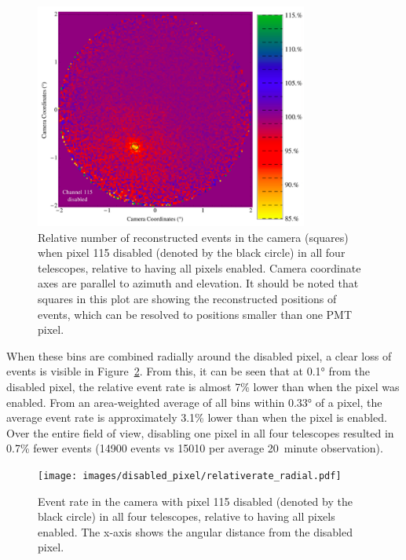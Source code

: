 \begin{figure}[!ht]
  \centering
  \includegraphics[width=0.8\textwidth]{images/disabled_pixel/relativerate_camera}
  \caption[Relative Event Rate After Disabling Camera Pixels]{
    Relative number of reconstructed events in the camera (squares) when pixel 115 disabled (denoted by the black circle) in all four telescopes, relative to having all pixels enabled.
    Camera coordinate axes are parallel to azimuth and elevation.
    It should be noted that squares in this plot are showing the reconstructed positions of events, which can be resolved to positions smaller than one PMT pixel.
  }
  \label{fig:dpix_rel_camera}
\end{figure}

When these bins are combined radially around the disabled pixel, a clear loss of events is visible in Figure~\ref{fig:dpix_rel_radial}.
From this, it can be seen that at \ang{0.1} from the disabled pixel, the relative event rate is almost 7\% lower than when the pixel was enabled.
From an area-weighted average of all bins within \ang{0.33} of a pixel, the average event rate is approximately 3.1\% lower than when the pixel is enabled.
Over the entire field of view, disabling one pixel in all four telescopes resulted in 0.7\% fewer events (14900 events vs 15010 per average \SI{20}{minute} observation).

\begin{figure}[!ht]
  \centering
  \texttt{[image: images/disabled\_pixel/relativerate\_radial.pdf]}
  \caption[Relative Event Rate After Disabling Camera Pixels]{
    Event rate in the camera with pixel 115 disabled (denoted by the black circle) in all four telescopes, relative to having all pixels enabled.
    The x-axis shows the angular distance from the disabled pixel.
  }
  \label{fig:dpix_rel_radial}
\end{figure}

